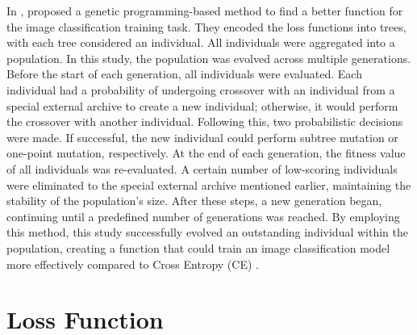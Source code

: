 \begin{ZhChapter}
    In \cite{akhmedova2024generationlossfunctionimage}, \citeauthor{akhmedova2024generationlossfunctionimage} proposed a genetic programming-based method to find a better function for the image classification training task. They encoded the loss functions into trees, with each tree considered an individual. All individuals were aggregated into a population. In this study, the population was evolved across multiple generations. Before the start of each generation, all individuals were evaluated. Each individual had a probability of undergoing crossover with an individual from a special external archive to create a new individual; otherwise, it would perform the crossover with another individual. Following this, two probabilistic decisions were made. If successful, the new individual could perform subtree mutation or one-point mutation, respectively. At the end of each generation, the fitness value of all individuals was re-evaluated. A certain number of low-scoring individuals were eliminated to the special external archive mentioned earlier, maintaining the stability of the population's size. After these steps, a new generation began, continuing until a predefined number of generations was reached.  By employing this method, this study successfully evolved an outstanding individual within the population, creating a function that could train an image classification model more effectively compared to Cross Entropy (CE) \cite{zhang2018generalized}.

    \section{Loss Function}


\end{ZhChapter}
